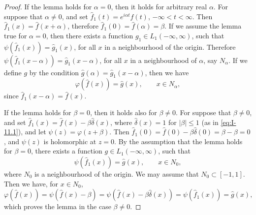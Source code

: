 \begin{proof}
If the lemma holds for $\alpha=0$, then it holds for arbitrary real $\alpha$. For suppose that $\alpha\neq 0$, and set $\widehat f_1(t)=e^{i\alpha t}f(t)$, $-\infty<t<\infty$. Then $\widehat f_1(x)=\widehat f(x+\alpha)$, therefore $\widehat f_1(0)=\widehat f(\alpha)=\beta$. If we assume the lemma true for $\alpha=0$, then there exists a function $g_1\in L_1(-\infty,\infty)$, such that $\psi(\widehat f_1(x))=\widehat g_1(x)$, for all $x$ in a neighbourhood of the origin. Therefore $\psi(\widehat f_1(x-\alpha))=\widehat g_1(x-\alpha)$, for all $x$ in a neighbourhood of $\alpha$, say $N_\alpha$. If we define $g$ by the condition $\widehat g(\alpha)=\widehat g_1(x-\alpha)$, then we have
\begin{equation*}
\varphi(\widehat f(x))=\widehat g(x),\qquad x\in N_\alpha,
\end{equation*}
since $\widehat f_1(x-\alpha)=\widehat f(x)$.

If the lemma holds for $\beta=0$, then it holds also for $\beta\neq 0$. For suppose that $\beta\neq 0$, and set $\widehat f_1(x)=\widehat f(x)-\beta\widehat\delta(x)$, where $\widehat\delta(x)=1$ for $|\beta|\le 1$ (as in \eqref{eq:I-11.1}), and let $\psi(z)=\varphi(z+\beta)$. Then $\widehat f_1(0)=\widehat f(0)-\beta\widehat\delta(0)=\beta-\beta=0$, and $\psi(z)$ is holomorphic at $z=0$. By the assumption that the lemma holds for $\beta=0$, there exists a function $g\in L_1(-\infty,\infty)$, such that
\begin{equation*}
\psi(\widehat f_1(x))=\widehat g(x),\qquad x\in N_0,
\end{equation*}
where $N_0$ is a neighbourhood of the origin. We may assume that $N_0\subset[-1,1]$. Then we have, for $x\in N_0$,
\begin{equation*}
\varphi(\widehat f(x))=\psi(\widehat f(x)-\beta)=\psi(\widehat f(x)-\beta\widehat\delta(x))=\psi(\widehat f_1(x))=\widehat g(x),
\end{equation*}
which proves the lemma in the case $\beta\neq 0$.


\end{proof}
